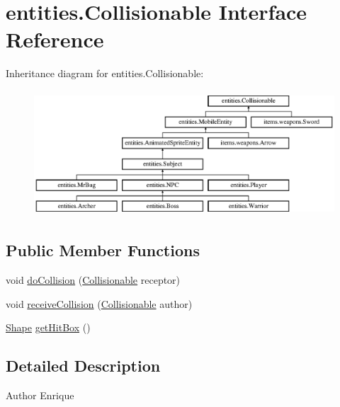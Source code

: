 \hypertarget{interfaceentities_1_1_collisionable}{}\section{entities.\+Collisionable Interface Reference}
\label{interfaceentities_1_1_collisionable}
Inheritance diagram for entities.\+Collisionable\+:\begin{figure}[H]
\begin{center}
\leavevmode
\includegraphics[height=4.692738cm]{interfaceentities_1_1_collisionable}
\end{center}
\end{figure}
\subsection*{Public Member Functions}
\begin{DoxyCompactItemize}
\item 
void \mbox{\hyperlink{interfaceentities_1_1_collisionable_aaebba0fda34be003cfe326471e1418c8}{do\+Collision}} (\mbox{\hyperlink{interfaceentities_1_1_collisionable}{Collisionable}} receptor)
\item 
void \mbox{\hyperlink{interfaceentities_1_1_collisionable_a956a85182fef376af333622e844342e3}{receive\+Collision}} (\mbox{\hyperlink{interfaceentities_1_1_collisionable}{Collisionable}} author)
\item 
\mbox{\hyperlink{classorg_1_1newdawn_1_1slick_1_1geom_1_1_shape}{Shape}} \mbox{\hyperlink{interfaceentities_1_1_collisionable_a850ae5aa594d7b0d29ccef98436b8e77}{get\+Hit\+Box}} ()
\end{DoxyCompactItemize}


\subsection{Detailed Description}
\begin{DoxyAuthor}{Author}
Enrique 
\end{DoxyAuthor}


